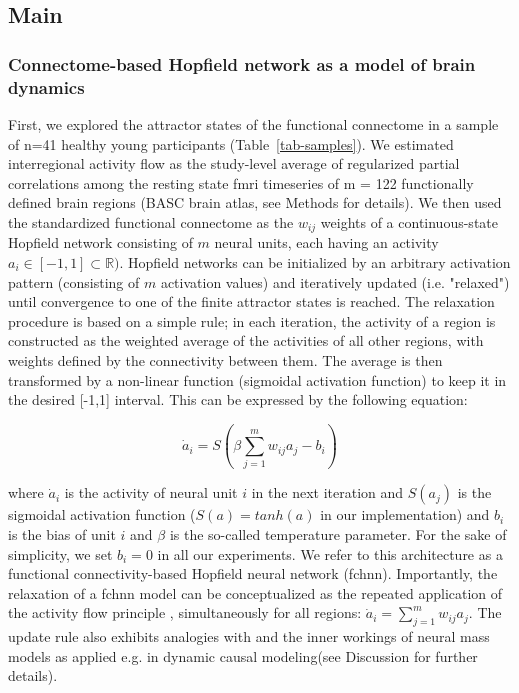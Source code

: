 \documentclass{article}
\begin{document}
\subsection{Main}\label{Main}

\subsubsection{Connectome-based Hopfield network as a model of brain dynamics}\label{Connectome-based Hopfield network as a model of brain dynamics}

First, we explored the attractor states of the functional connectome in a sample of n=41 healthy young
participants (Table~\ref{tab-samples}). We estimated interregional activity flow \citep{cole2016activity, ito2017cognitive}
as the study-level average of regularized partial correlations among the resting state \acrshort{fmri} timeseries of m = 122
functionally defined brain regions (BASC brain atlas, see Methods for details). We then used the standardized
functional connectome as the $w_{ij}$  weights of a continuous-state Hopfield network
\citep{hopfield1982neural, koiran1994dynamics} consisting of $m$ neural units, each having an activity
$a_i \in [ -1,1] \subset \mathbb{R})$. Hopfield networks can be initialized by an arbitrary activation pattern (consisting of
$m$ activation values) and iteratively updated (i.e. "relaxed") until convergence to one of the finite attractor states is reached. The relaxation procedure is based on a simple rule; in each iteration, the activity of a region is constructed as the weighted average of the activities of all other regions, with weights defined by the connectivity between them. The average is then transformed by a non-linear function (sigmoidal activation function) to keep it in the desired [-1,1] interval.
This can be expressed by the following equation:

\begin{equation}
\label{hopfield-update}
\dot{a}_i = S(\beta \sum_{j=1}^m w_{ij}a_j - b_i)
\end{equation}

where $\dot{a}_i$ is the activity of neural unit $i$ in the next iteration and $S(a_j)$ is the sigmoidal activation
function ($S(a) = tanh(a)$ in our implementation) and $b_i$ is the bias of unit $i$ and $\beta$ is the so-called temperature parameter. For the sake of simplicity, we set $b_i=0$ in all our experiments. We refer to this architecture as a functional connectivity-based Hopfield neural network (\acrshort{fchnn}). Importantly, the relaxation of a \acrshort{fchnn} model can be conceptualized as the repeated
application of the activity flow principle \citep{cole2016activity, ito2017cognitive} , simultaneously for all
regions: $\dot{a}_i = \sum_{j=1}^m w_{ij}a_j$. The update rule also exhibits analogies with  \citep{gu2015controllability} and the inner workings of neural mass models \citep{breakspear2017dynamic} as applied e.g. in dynamic causal modeling(see Discussion for further details).
\end{document}
